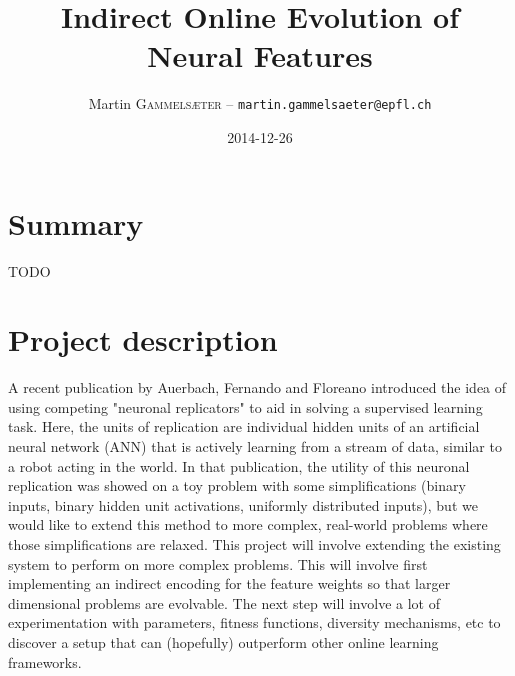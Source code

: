 \documentclass[a4paper]{article}
\title{Indirect Online Evolution of Neural Features} %
\author{Martin \textsc{Gammelsæter} -- \texttt{martin.gammelsaeter@epfl.ch}}
\date{2014-12-26}
\numberwithin{equation}{section}
\begin{document}
\maketitle

\tableofcontents
\newpage

\vspace*{\fill}
\section{Summary}
TODO
\vspace*{\fill}
\newpage

\vspace*{\fill}
\section{Project description}


A recent publication by Auerbach, Fernando and Floreano \cite{auerbach2014online}
introduced the idea of using competing "neuronal replicators" to aid in solving
a supervised learning task. Here, the units of replication are individual
hidden units of an artificial neural network (ANN) that is actively learning
from a stream of data, similar to a robot acting in the world. In that
publication, the utility of this neuronal replication was showed on a toy
problem with some simplifications (binary inputs, binary hidden unit
activations, uniformly distributed inputs), but we would like to extend this
method to more complex, real-world problems where those simplifications are
relaxed. This project will involve extending the existing system to perform on
more complex problems. This will involve first implementing an indirect
encoding for the feature weights so that larger dimensional problems are
evolvable. The next step will involve a lot of experimentation with
parameters, fitness functions, diversity mechanisms, etc to discover a setup
that can (hopefully) outperform other online learning frameworks.

\vspace*{\fill}
\newpage
\end{document}

